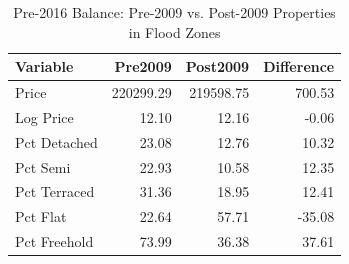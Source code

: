 \begin{table}[!h]
\centering
\caption{\label{tab:tab:balance}Pre-2016 Balance: Pre-2009 vs. Post-2009 Properties in Flood Zones}
\centering
\begin{tabular}[t]{lrrr}
\toprule
Variable & Pre2009 & Post2009 & Difference\\
\midrule
Price & 220299.29 & 219598.75 & 700.53\\
Log Price & 12.10 & 12.16 & -0.06\\
Pct Detached & 23.08 & 12.76 & 10.32\\
Pct Semi & 22.93 & 10.58 & 12.35\\
Pct Terraced & 31.36 & 18.95 & 12.41\\
\addlinespace
Pct Flat & 22.64 & 57.71 & -35.08\\
Pct Freehold & 73.99 & 36.38 & 37.61\\
\bottomrule
\end{tabular}
\end{table}
